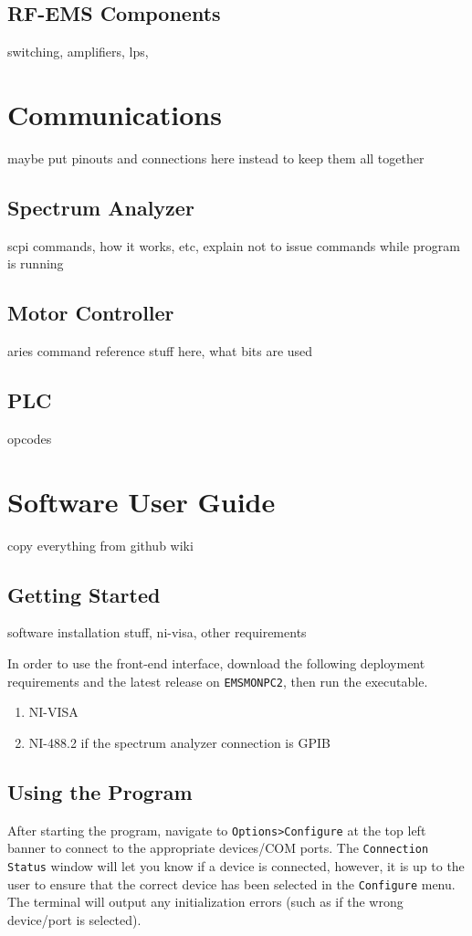 \documentclass[titlepage]{article}
\begin{document}
\subsection{RF-EMS Components}
switching, amplifiers, lps,

\section{Communications}
maybe put pinouts and connections here instead to keep them all together
\subsection{Spectrum Analyzer}
scpi commands, how it works, etc, explain not to issue commands while program is running
\subsection{Motor Controller}
aries command reference stuff here, what bits are used
\subsection{PLC}
opcodes

\section{Software User Guide}
copy everything from github wiki
\subsection{Getting Started}
software installation stuff, ni-visa, other requirements

In order to use the front-end interface, download the following deployment requirements and the latest release on \verb|EMSMONPC2|, then run the executable.
\begin{enumerate}
  \item NI-VISA
  \item NI-488.2 if the spectrum analyzer connection is GPIB
\end{enumerate}

\subsection{Using the Program}
After starting the program, navigate to \verb|Options>Configure| at the top left banner to connect to the appropriate devices/COM ports. The \verb|Connection Status| window will let you know if a device is connected, however, it is up to the user to ensure that the correct device has been selected in the \verb|Configure| menu. The terminal will output any initialization errors (such as if the wrong device/port is selected).
\end{document}
